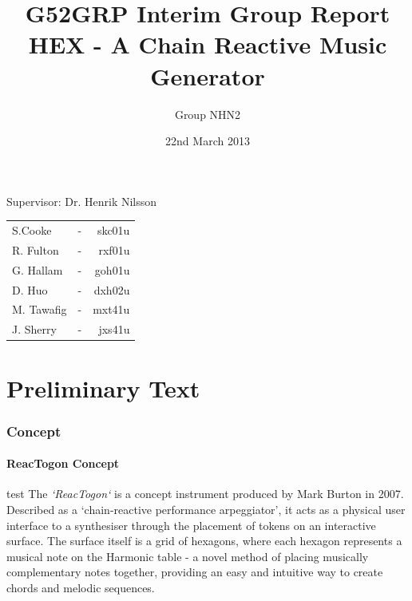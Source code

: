 \documentclass[10pt,a4paper]{article}
\begin{document}
\begin{titlepage}
\title{G52GRP Interim Group Report\\HEX - A Chain Reactive Music Generator }
\author{Group NHN2}
\date{22nd March 2013}
\maketitle
\thispagestyle{empty}
\begin{center}
Supervisor: Dr. Henrik Nilsson\\
\bigskip
\begin{tabular}{ l c r }
  S.Cooke & - & skc01u \\
  R. Fulton & - & rxf01u \\
  G. Hallam & - & goh01u \\
  D. Huo & - & dxh02u \\
  M. Tawafig & - & mxt41u \\
  J. Sherry & - & jxs41u \\  
\end{tabular}
\end{center}
\end{titlepage}

\tableofcontents
\pagebreak

\part{Preliminary Text}
\section{Concept}
\subsection{ReacTogon Concept}
test
The \textit{`ReacTogon`}\cite{modin} is a concept instrument produced by Mark Burton in 2007. Described as a `chain-reactive performance arpeggiator’, it acts as a physical user interface to a synthesiser through the placement of tokens on an interactive surface. The surface itself is a grid of hexagons, where each hexagon represents a musical note on the Harmonic table\cite{wikipediaHarmTab} - a novel method of placing musically complementary notes together, providing an easy and intuitive way to create chords and melodic sequences.\\
\end{document}
